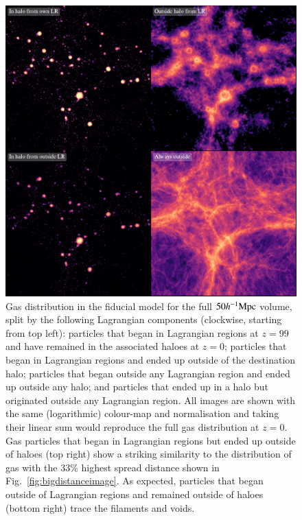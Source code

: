 \begin{figure}
    \centering
    \vspace{1cm}
    \includegraphics{figures/s50j7kAHF/four_images_magma_AHF.pdf}
    \caption{Gas distribution in the fiducial \simba{} model for the full
    $50h^{-1}{\rm Mpc}{}$ volume, split by the following Lagrangian components
    (clockwise, starting from top left): particles that began in Lagrangian
    regions at $z=99$ and have remained in the associated haloes at $z=0$;
    particles that began in Lagrangian regions and ended up outside of the
    destination halo; particles that began outside any Lagrangian region and
    ended up outside any halo; and particles that ended up in a halo but
    originated outside any Lagrangian region. All images are shown with the
    same (logarithmic) colour-map and normalisation and taking their linear
    sum would reproduce the full gas distribution at $z=0$. Gas particles
    that began in Lagrangian regions but ended up outside of haloes (top
    right) show a striking similarity to the distribution of gas with the
    33\% highest spread distance shown in Fig.~\ref{fig:bigdistanceimage}.
    As expected, particles that began outside of Lagrangian regions and
    remained outside of haloes (bottom right) trace the filaments and voids.}
    \vspace{1cm}
    \label{fig:lrtransfer}
\end{figure}

